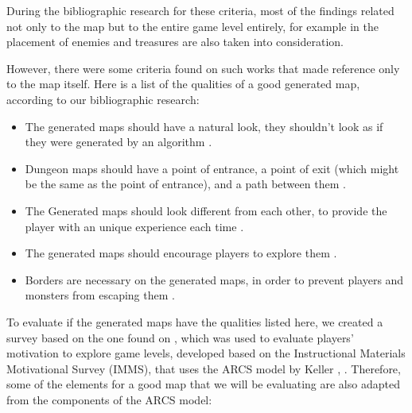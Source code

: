 During the bibliographic research for these criteria, most of the findings related not only to the map but to the entire game level entirely, for example in \textcite{preuss:2014} the placement of enemies and treasures are also taken into consideration.

However, there were some criteria found on such works that made reference only to the map itself. Here is a list of the qualities of a good generated map, according to our bibliographic research:

\begin{itemize}
\item The generated maps should have a natural look, they shouldn't look as if they were generated by an algorithm \cite{shaker:2016} \cite{adams:2002}.
\item Dungeon maps should have a point of entrance, a point of exit (which might be the same as the point of entrance), and a path between them \cite{shaker:2016}.
\item The Generated maps should look different from each other, to provide the player with an unique experience each time \cite{goncalves:2015} \cite{zapata:2014}.
\item The generated maps should encourage players to explore them \cite{ping:2020}.
\item Borders are necessary on the generated maps, in order to prevent players and monsters from escaping them \cite{torrado:2020}.
\end{itemize}

To evaluate if the generated maps have the qualities listed here, we created a survey based on the one found on \textcite{carvalho:2016}, which was used to evaluate players' motivation to explore game levels, developed based on the Instructional Materials Motivational Survey (IMMS), that uses the ARCS model by Keller \cite{keller:1987}, \cite{keller:1993}. Therefore, some of the elements for a good map that we will be evaluating are also adapted from the components of the ARCS model:


